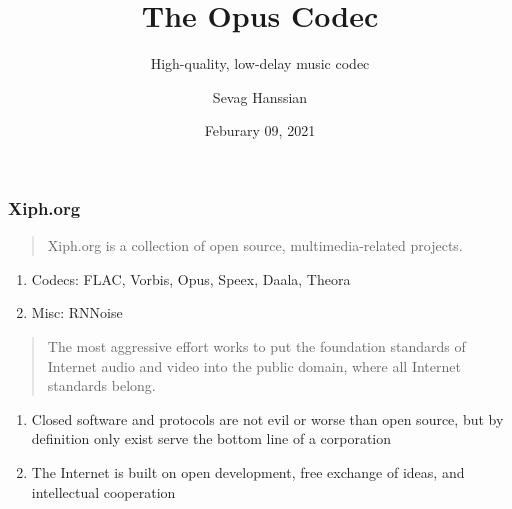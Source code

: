 \documentclass{beamer}
\title{The Opus Codec}
\subtitle{High-quality, low-delay music codec}
\author{Sevag Hanssian}
\date{Feburary 09, 2021}
\institute{MUMT 621, Winter 2021}
\begin{document}
\begin{frame}
\maketitle
\end{frame}

\begin{frame}
	\frametitle{Xiph.org}
	\begin{quote}
		Xiph.org is a collection of open source, multimedia-related projects.
	\end{quote}
	\begin{enumerate}
			\vspace{-0.5em}
		\item
			Codecs: FLAC, Vorbis, Opus, Speex, Daala, Theora
		\item
			Misc: RNNoise
	\end{enumerate}
	\vspace{1em}
	\begin{quote}
		The most aggressive effort works to put the foundation standards of Internet audio and video into the public domain, where all Internet standards belong.
	\end{quote}
	\begin{enumerate}
			\vspace{-0.5em}
		\item
			Closed software and protocols are not evil or worse than open source, but by definition only exist serve the bottom line of a corporation
		\item
			 The Internet is built on open development, free exchange of ideas, and intellectual cooperation
	\end{enumerate}
\end{frame}

\end{document}
